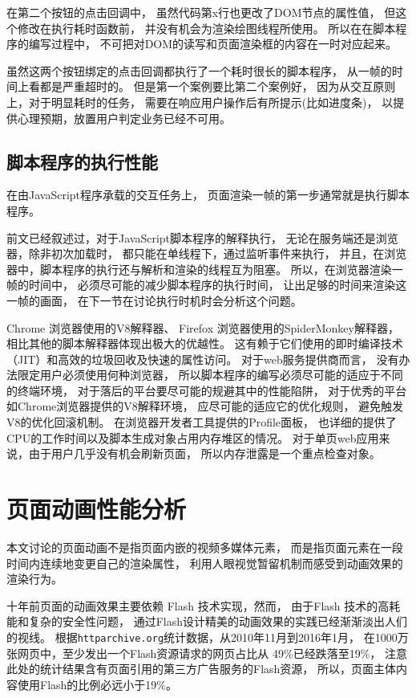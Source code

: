 在第二个按钮的点击回调中，
虽然代码第x行也更改了DOM节点的属性值，
但这个修改在执行耗时函数前，
并没有机会为渲染绘图线程所使用。
所以在在脚本程序的编写过程中，
不可把对DOM的读写和页面渲染框的内容在一时对应起来。

虽然这两个按钮绑定的点击回调都执行了一个耗时很长的脚本程序，
从一帧的时间上看都是严重超时的。
但是第一个案例要比第二个案例好，
因为从交互原则上，对于明显耗时的任务，
需要在响应用户操作后有所提示(比如进度条)，
以提供心理预期，放置用户判定业务已经不可用。



\subsection{脚本程序的执行性能}

在由JavaScript程序承载的交互任务上，
页面渲染一帧的第一步通常就是执行脚本程序。

前文已经叙述过，对于JavaScript脚本程序的解释执行，
无论在服务端还是浏览器，除非初次加载时，
都只能在单线程下，通过监听事件来执行，
并且，在浏览器中，脚本程序的执行还与解析和渲染的线程互为阻塞。
所以，在浏览器渲染一帧的时间中，
必须尽可能的减少脚本程序的执行时间，
让出足够的时间来渲染这一帧的画面，
在下一节在讨论执行时机时会分析这个问题。

Chrome 浏览器使用的V8解释器、
Firefox 浏览器使用的SpiderMonkey解释器，
相比其他的脚本解释器体现出极大的优越性。
这有赖于它们使用的即时编译技术（JIT）和高效的垃圾回收及快速的属性访问。
对于web服务提供商而言，
没有办法限定用户必须使用何种浏览器，
所以脚本程序的编写必须尽可能的适应于不同的终端环境，
对于落后的平台要尽可能的规避其中的性能陷阱，
对于优秀的平台如Chrome浏览器提供的V8解释环境，
应尽可能的适应它的优化规则，
避免触发V8的优化回滚机制。
在浏览器开发者工具提供的Profile面板，
也详细的提供了CPU的工作时间以及脚本生成对象占用内存堆区的情况。
对于单页web应用来说，由于用户几乎没有机会刷新页面，
所以内存泄露是一个重点检查对象。


\section{页面动画性能分析}

本文讨论的页面动画不是指页面内嵌的视频多媒体元素，
而是指页面元素在一段时间内连续地变更自己的渲染属性，
利用人眼视觉暂留机制而感受到动画效果的渲染行为。

十年前页面的动画效果主要依赖 Flash 技术实现，然而，
由于Flash 技术的高耗能和复杂的安全性问题，
通过Flash设计精美的动画效果的实践已经渐渐淡出人们的视线。
根据\texttt{httparchive.org}统计数据，从2010年11月到2016年1月，
在1000万张网页中，至少发出一个Flash资源请求的网页占比从 49\%已经跌落至19\%，
注意此处的统计结果含有页面引用的第三方广告服务的Flash资源，
所以，页面主体内容使用Flash的比例必远小于19\%。

